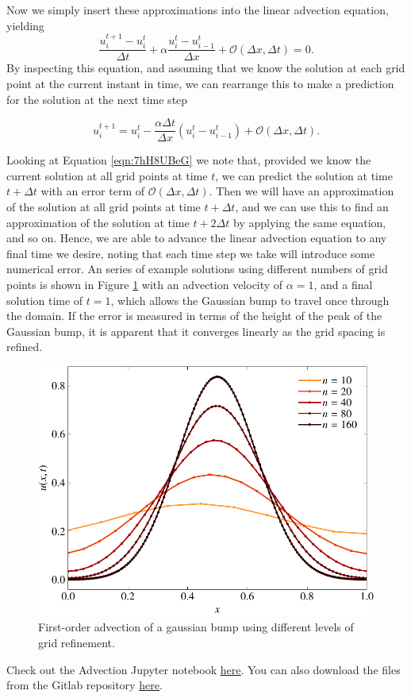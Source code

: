 Now we simply insert these approximations into the linear advection equation, yielding
\begin{equation}
	\frac{u_i^{t+1} - u_{i}^t}{\Delta t} +  \alpha \frac{u_i^t - u_{i-1}^t}{\Delta x} + \mathcal{O}(\Delta x, \Delta t) = 0.
\end{equation}
By inspecting this equation, and assuming that we know the solution at each grid point at the current instant in time, we can rearrange this to make a prediction for the solution at the next time step
\begin{eqBox}
\begin{equation}
	u_i^{t+1} = u_{i}^t -\frac{\alpha \Delta t}{\Delta x} \left( u_i^t - u_{i-1}^t \right) + \mathcal{O}(\Delta x, \Delta t).
	\label{eqn:7hH8UBeG}
\end{equation}
\end{eqBox}

Looking at Equation \ref{eqn:7hH8UBeG} we note that, provided we know the current solution at all grid points at time $t$, we can predict the solution at time $t+\Delta t$ with an error term of $\mathcal{O}(\Delta x, \Delta t)$. Then we will have an approximation of the solution at all grid points at time $t+\Delta t$, and we can use this to find an approximation of the solution at time $t+2\Delta t$ by applying the same equation, and so on. Hence, we are able to advance the linear advection equation to any final time we desire, noting that each time step we take will introduce some numerical error. An series of example solutions using different numbers of grid points is shown in Figure \ref{fig:advection_upwind} with an advection velocity of $\alpha = 1$, and a final solution time of $t=1$, which allows the Gaussian bump to travel once through the domain. If the error is measured in terms of the height of the peak of the Gaussian bump, it is apparent that it converges linearly as the grid spacing is refined.
\begin{figure}[htbp]
	\centering
	\includegraphics[width=0.65\linewidth]{Pictures/advection_upwind}
	\caption{First-order advection of a gaussian bump using different levels of grid refinement.}
	\label{fig:advection_upwind}
\end{figure}
\begin{jupyternote}
	Check out the Advection Jupyter notebook \href{\binderurl}{\underline{here}}. You can also download the files from the Gitlab repository \href{\repourl}{\underline{here}}.
\end{jupyternote}
